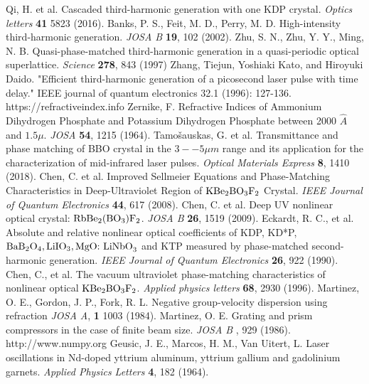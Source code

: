 \documentclass[a4paper, 12pt, onecolumn]{extarticle}
\begin{document}
\begin{thebibliography}{0}
 Qi, H. et al. Cascaded third-harmonic generation with one KDP crystal. \textit{Optics letters} \textbf{41} 5823 (2016).
 Banks, P. S., Feit, M. D., Perry, M. D. High-intensity third-harmonic generation. \textit{JOSA B} \textbf{19}, 102 (2002).
 Zhu, S. N., Zhu, Y. Y., Ming, N. B. Quasi-phase-matched third-harmonic generation in a quasi-periodic optical superlattice. \textit{Science} \textbf{278}, 843 (1997)
 Zhang, Tiejun, Yoshiaki Kato, and Hiroyuki Daido. "Efficient third-harmonic generation of a picosecond laser pulse with time delay." IEEE journal of quantum electronics 32.1 (1996): 127-136.
 https://refractiveindex.info
 Zernike, F.  Refractive Indices of Ammonium Dihydrogen Phosphate and Potassium Dihydrogen Phosphate between 2000 $\hat{A}$ and $1.5\mu$. \textit{JOSA} \textbf{54}, 1215 (1964).
 Tamo\v{s}auskas, G. et al. Transmittance and phase matching of BBO crystal in the \(3 -- 5 \mu m\) range and its application for the characterization of mid-infrared laser pulses. \textit{Optical Materials Express} \textbf{8}, 1410 (2018).
 Chen, C. et al. Improved Sellmeier Equations and Phase-Matching Characteristics in Deep-Ultraviolet Region of ${\hbox {KBe}} _ {2}{\hbox {BO}} _ {3}{\hbox {F}} _ {2} $ Crystal. \textit{IEEE Journal of Quantum Electronics} \textbf{44}, 617 (2008).
 Chen, C. et al. Deep UV nonlinear optical crystal: $\hbox{RbBe}_2(\hbox{BO}_3)\hbox{F}_2$. \textit{JOSA B} \textbf{26}, 1519 (2009).
 Eckardt, R. C., et al. Absolute and relative nonlinear optical coefficients of KDP, KD*P, $\hbox{BaB}_2\hbox{O}_4, \hbox{LiIO}_3, \hbox{MgO: LiNbO}_3$ and KTP measured by phase-matched second-harmonic generation. \textit{IEEE Journal of Quantum Electronics} \textbf{26}, 922 (1990).
 Chen, C., et al. The vacuum ultraviolet phase-matching characteristics of nonlinear optical ${\hbox {KBe}} _ {2}{\hbox {BO}} _ {3}{\hbox {F}} _ {2} $. \textit{Applied physics letters} \textbf{68}, 2930 (1996).
 Martinez, O. E., Gordon, J. P., Fork, R. L. Negative group-velocity dispersion using refraction \textit{JOSA A}, \textbf{1} 1003 (1984).
 Martinez, O. E. Grating and prism compressors in the case of finite beam size. \textit{JOSA B} , 929 (1986).
 http://www.numpy.org
 Geusic, J. E., Marcos, H. M., Van Uitert, L. Laser oscillations in Nd-doped yttrium aluminum, yttrium gallium and gadolinium garnets. \textit{Applied Physics Letters} \textbf{4}, 182 (1964).
\end{thebibliography}
\end{document}
